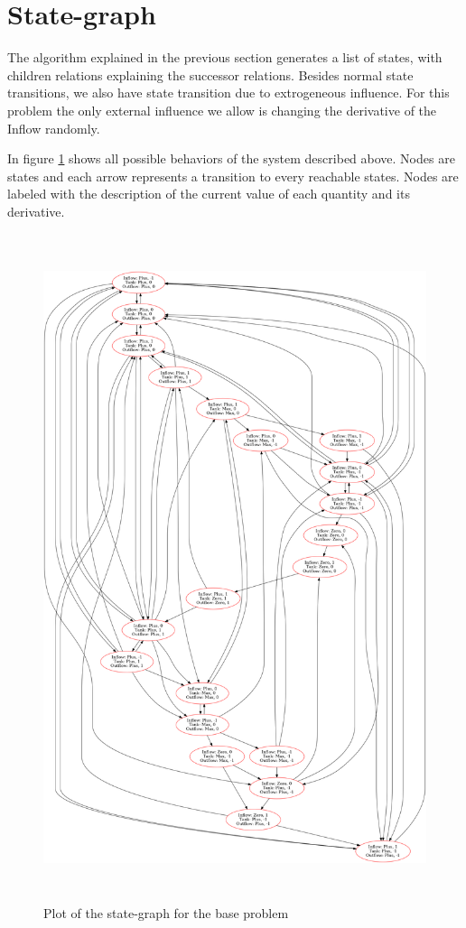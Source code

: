 \documentclass[a4paper]{article}
\begin{document}
\section{State-graph}
The algorithm explained in the previous section generates a list of states, with children relations explaining the successor relations. Besides normal state transitions, we also have state transition due to extrogeneous influence. For this problem the only external influence we allow is changing the derivative of the Inflow randomly.

In figure \ref{state-graph-base} shows all possible behaviors of the system described above. Nodes are states and each arrow represents a transition to every reachable states. Nodes are labeled with the description of the current value of each quantity and its derivative.

\begin{figure}[H]\label{state-graph-base}
\centering
\includegraphics[width=\textwidth,height=7.7in,keepaspectratio]{result_base_problem.png}
\caption{Plot of the state-graph for the base problem}
\end{figure}
\end{document}
